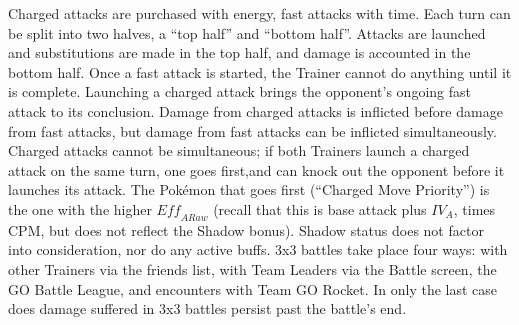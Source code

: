 Charged attacks are purchased with energy, fast attacks with time.
Each turn can be split into two halves, a ``top half'' and ``bottom half''.
Attacks are launched and substitutions are made in the top half, and damage is accounted in the bottom half.
Once a fast attack is started, the Trainer cannot do anything until it is complete.
Launching a charged attack brings the opponent's ongoing fast attack to its conclusion.
Damage from charged attacks is inflicted before damage from fast attacks,
  but damage from fast attacks can be inflicted simultaneously.
Charged attacks cannot be simultaneous; if both Trainers launch a charged attack
  on the same turn, one goes first,and can knock out the opponent before it
  launches its attack.
The Pokémon that goes first (``Charged Move Priority'') is the one with the
  higher $\mathit{Eff_{ARaw}}$ (recall that this is base attack plus $\mathit{IV_A}$, times CPM, but does not reflect the Shadow bonus).
Shadow status does not factor into consideration, nor do any active buffs.
3x3 battles take place four ways: with other Trainers via the friends list,
 with Team Leaders via the Battle screen, the GO Battle League,
 and encounters with Team GO Rocket.
In only the last case does damage suffered in 3x3 battles persist past the battle's end.

